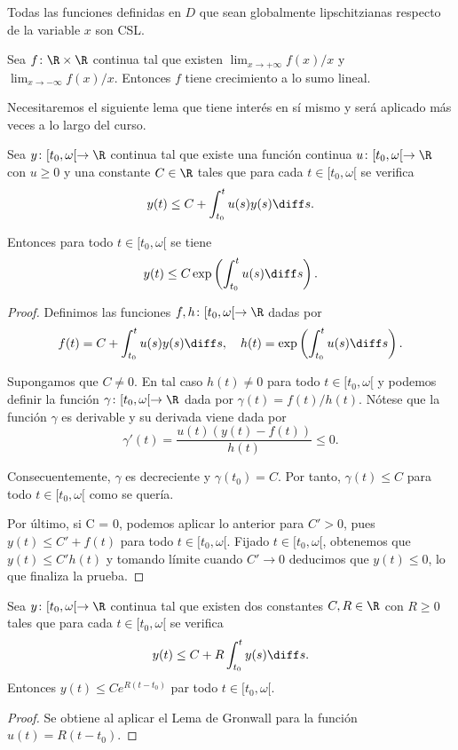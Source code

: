 \documentclass{article}
\begin{document}
\begin{remark}
  Todas las funciones definidas en $D$ que sean globalmente lipschitzianas respecto de la variable
  $x$ son CSL.
\end{remark}

\begin{remark}
  Sea $f \colon \R \times \R$ continua tal que existen $\lim_{x \to +\infty} f(x)/x$ y
  $\lim_{x \to -\infty} f(x)/x$. Entonces $f$ tiene crecimiento a lo sumo lineal.
\end{remark}

Necesitaremos el siguiente lema que tiene interés en sí mismo y será aplicado más veces a lo largo
del curso.


\begin{lemma}
  Sea $y \colon [t_0, \omega[ \to \R$ continua tal que existe una función continua
  $u \colon [t_0, \omega[ \to \R$ con $u \ge 0$ y una constante $C \in \R$ tales que para cada
  $t \in [t_0, \omega[$ se verifica
  \[ y(t) \le C + \int_{t_0}^{t} u(s)y(s) \diff s. \]

  Entonces para todo $t \in [t_0, \omega[$ se tiene
  \[y(t) \le C \exp\left(\int_{t_0}^t u(s) \diff s\right).\]
\end{lemma}
\begin{proof}
  Definimos las funciones $f, h \colon [t_0, \omega[ \to \R$ dadas por
  \[ f(t) = C + \int_{t_0}^t u(s) y(s) \diff s, \quad h(t) = \exp \left( \int_{t_0}^t u(s) \diff
      s\right). \]

  Supongamos que $C \ne 0$. En tal caso $h(t) \ne 0$ para todo $t \in [t_0,\omega[$ y podemos
  definir la función $\gamma\colon [t_0, \omega[ \to \R$ dada por $\gamma(t) = f(t) / h(t)$. Nótese
  que la función $\gamma$ es derivable y su derivada viene dada por
  \[ \gamma'(t) = \frac{u(t)(y(t)- f(t))}{h(t)} \le 0.\]

  Consecuentemente, $\gamma$ es decreciente y $\gamma(t_0) = C$. Por tanto, $\gamma(t) \le C$ para
  todo $t \in [t_0, \omega[$ como se quería.

  Por último, si C = 0, podemos aplicar lo anterior para $C' > 0$, pues $y(t) \le C' + f(t)$ para
  todo $t \in [t_0, \omega[$. Fijado $t \in [t_0, \omega[$, obtenemos que $y(t) \le C'h(t)$ y
  tomando límite cuando $C' \to 0$ deducimos que $y(t) \le 0$, lo que finaliza la prueba.
\end{proof}

\begin{cor}
  Sea $y \colon [t_0, \omega[ \to \R$ continua tal que existen dos constantes $C, R \in \R$ con
  $R \ge 0$ tales que para cada $t \in [t_0, \omega[$ se verifica
  \[ y(t) \le C + R \int_{t_0}^{t} y(s) \diff s. \] Entonces $y(t) \le C e^{R(t-t_0)}$ par todo
  $t \in [t_0, \omega[$.
\end{cor}
\begin{proof}
  Se obtiene al aplicar el Lema de Gronwall para la función $u(t) = R(t-t_0)$.
\end{proof}
\end{document}
